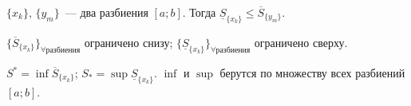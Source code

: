 \documentclass[12pt]{article}
\newcommand{\dint}{\displaystyle\int}
\begin{document}
	\begin{lemma}
		$\{ x_k \}, \, \{ y_m \}$~--- два разбиения $[a; b]$. Тогда $\underline{S}_{\{ x_k \}} \leqslant \overline{S}_{\{ y_m \}}$.
	\end{lemma}
	
	\begin{statement}
		$\{ \overline{S}_{\{ x_k \}} \}_{\forall \text{разбиения}}$ ограничено снизу; $\{ \underline{S}_{\{ x_k \}} \}_{\forall \text{разбиения}}$ ограничено сверху.
	\end{statement}
	
	\begin{definition}
		$S^* = \inf \overline{S}_{\{ x_k \}}$; $S_* = \sup \underline{S}_{\{ x_k \}}$. $\inf$ и $\sup$ берутся по множеству всех разбиений $[a; b]$.
	\end{definition}
	
%	
%			
%			
%			
%			
%			
%			
%			
%			
%			
%			
%			
%			
\end{document}
